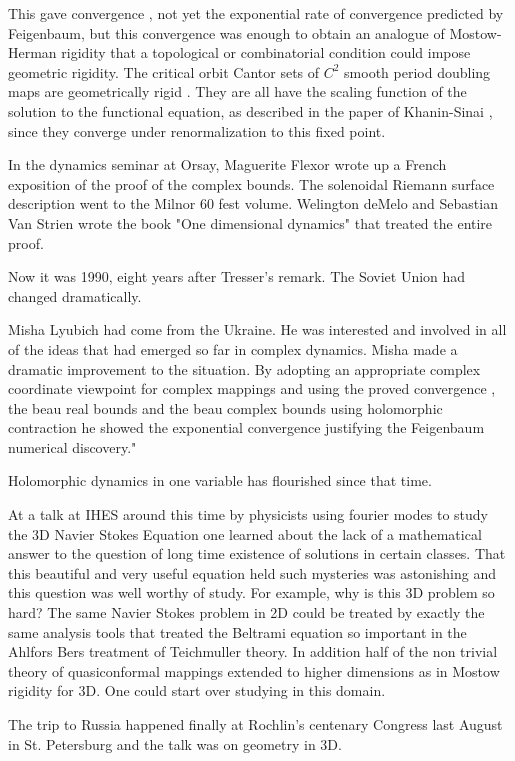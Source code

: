 \begin{description}
This gave convergence ,  not  yet the  exponential rate of convergence  predicted by Feigenbaum,   but this convergence  was enough to obtain   an  analogue of Mostow-Herman rigidity that a topological or combinatorial condition could impose geometric rigidity.
 The critical orbit Cantor sets  of $C^2$ smooth period doubling maps are  geometrically rigid . They are  all  have  the scaling function of the solution to the functional equation,  as described in the paper of Khanin-Sinai , since they converge under renormalization to this fixed point.




 In the dynamics seminar at Orsay,  Maguerite Flexor wrote up a French exposition  of the proof  of the complex bounds.  The  solenoidal Riemann surface  description  went to  the Milnor 60 fest  volume.  Welington  deMelo and Sebastian Van Strien wrote the  book   "One dimensional dynamics" that  treated  the  entire proof.

Now it was 1990, eight years after Tresser's remark. The Soviet Union had changed  dramatically.

  Misha Lyubich  had come from the Ukraine.
He was interested  and involved in all of the ideas that had emerged so far in complex dynamics.
   Misha  made a  dramatic  improvement  to the situation. By adopting an appropriate  complex coordinate viewpoint for complex mappings and using  the proved convergence , the beau  real bounds and the  beau complex bounds using holomorphic contraction he showed the  exponential convergence justifying the Feigenbaum  numerical discovery."

Holomorphic dynamics in one variable has  flourished since that time.

At a talk at IHES   around this time by physicists using fourier modes to study the 3D Navier Stokes Equation one learned about the lack of a mathematical answer to the question of long time existence of solutions in certain classes. That  this beautiful and very useful equation held such mysteries was astonishing and this question was well worthy of study.   For example, why is this 3D problem so hard? The same Navier Stokes  problem in 2D could be treated by exactly the same analysis tools that treated the Beltrami equation so important in the Ahlfors Bers treatment of Teichmuller theory.  In addition half of the non trivial theory of quasiconformal mappings extended to higher dimensions as in Mostow rigidity for  3D. One could start over studying in this domain.

  The  trip to Russia  happened finally  at Rochlin's centenary Congress last August in St. Petersburg and the talk was on geometry in 3D.


\end{description}
